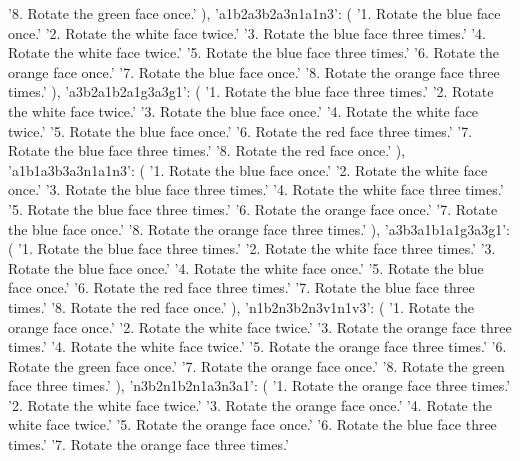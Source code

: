 {{            '8. Rotate the green face once.'
        ),
        'a1b2a3b2a3n1a1n3': (
            '1. Rotate the blue face once.\n'
            '2. Rotate the white face twice.\n'
            '3. Rotate the blue face three times.\n'
            '4. Rotate the white face twice.\n'
            '5. Rotate the blue face three times.\n'
            '6. Rotate the orange face once.\n'
            '7. Rotate the blue face once.\n'
            '8. Rotate the orange face three times.'
        ),
        'a3b2a1b2a1g3a3g1': (
            '1. Rotate the blue face three times.\n'
            '2. Rotate the white face twice.\n'
            '3. Rotate the blue face once.\n'
            '4. Rotate the white face twice.\n'
            '5. Rotate the blue face once.\n'
            '6. Rotate the red face three times.\n'
            '7. Rotate the blue face three times.\n'
            '8. Rotate the red face once.'
        ),
        'a1b1a3b3a3n1a1n3': (
            '1. Rotate the blue face once.\n'
            '2. Rotate the white face once.\n'
            '3. Rotate the blue face three times.\n'
            '4. Rotate the white face three times.\n'
            '5. Rotate the blue face three times.\n'
            '6. Rotate the orange face once.\n'
            '7. Rotate the blue face once.\n'
            '8. Rotate the orange face three times.'
        ),
        'a3b3a1b1a1g3a3g1': (
            '1. Rotate the blue face three times.\n'
            '2. Rotate the white face three times.\n'
            '3. Rotate the blue face once.\n'
            '4. Rotate the white face once.\n'
            '5. Rotate the blue face once.\n'
            '6. Rotate the red face three times.\n'
            '7. Rotate the blue face three times.\n'
            '8. Rotate the red face once.'
        ),
        'n1b2n3b2n3v1n1v3': (
            '1. Rotate the orange face once.\n'
            '2. Rotate the white face twice.\n'
            '3. Rotate the orange face three times.\n'
            '4. Rotate the white face twice.\n'
            '5. Rotate the orange face three times.\n'
            '6. Rotate the green face once.\n'
            '7. Rotate the orange face once.\n'
            '8. Rotate the green face three times.'
        ),
        'n3b2n1b2n1a3n3a1': (
            '1. Rotate the orange face three times.\n'
            '2. Rotate the white face twice.\n'
            '3. Rotate the orange face once.\n'
            '4. Rotate the white face twice.\n'
            '5. Rotate the orange face once.\n'
            '6. Rotate the blue face three times.\n'
            '7. Rotate the orange face three times.\n'
}}
